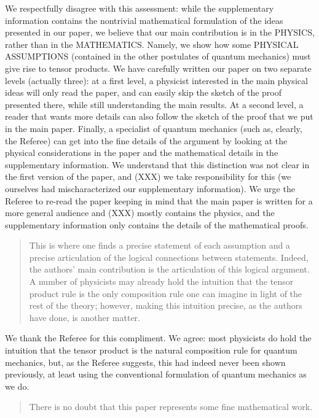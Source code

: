 \documentclass[11pt]{article}
\begin{document}
We respectfully disagree with this assessment: while the supplementary
information contains the nontrivial mathematical formulation of the
ideas presented in our paper, we believe that our main contribution is
in the PHYSICS, rather than in the MATHEMATICS. Namely, we show how
some PHYSICAL ASSUMPTIONS (contained in the other postulates of
quantum mechanics) must give rise to tensor products. We have
carefully written our paper on two separate levels (actually three):
at a first level, a physicist interested in the main physical ideas
will only read the paper, and can easily skip the sketch of the proof
presented there, while still understanding the main results. At a
second level, a reader that wants more details can also follow the
sketch of the proof that we put in the main paper. Finally, a
specialist of quantum mechanics (such as, clearly, the Referee) can
get into the fine details of the argument by looking at the physical
considerations in the paper and the mathematical details in the
supplementary information. We understand that this distinction was not
clear in the first version of the paper, and (XXX) we take
responsibility for this (we ourselves had mischaracterized our
supplementary information). We urge the Referee to re-read the paper
keeping in mind that the main paper is written for a more general
audience and (XXX) mostly contains the physics, and the supplementary
information only contains the details of the mathematical proofs.
\begin{quote}
This is where one finds a precise statement of each
assumption and a precise articulation of the logical connections
between statements. Indeed, the authors' main contribution is the
articulation of this logical argument. A number of physicists may
already hold the intuition that the tensor product rule is the only
composition rule one can imagine in light of the rest of the theory;
however, making this intuition precise, as the authors have done, is
another matter.\end{quote}

We thank the Referee for this compliment. We agree: most physicists do
hold the intuition that the tensor product is the natural composition
rule for quantum mechanics, but, as the Referee suggests, this had
indeed never been shown previously, at least using the conventional
formulation of quantum mechanics as we do.

\begin{quote}There is no doubt that this paper represents some fine
mathematical work.\end{quote}
\end{document}
